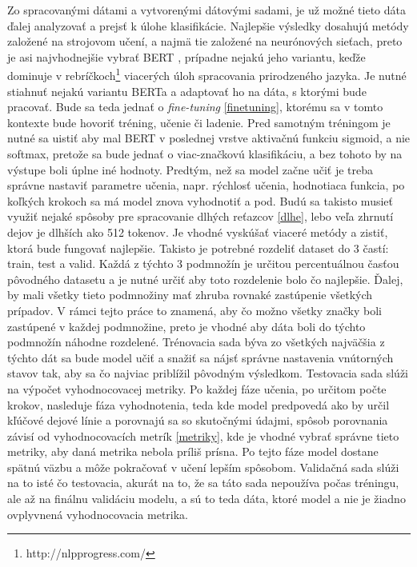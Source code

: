 Zo spracovanými dátami a vytvorenými dátovými sadami, je už možné tieto dáta ďalej analyzovať a prejsť k úlohe klasifikácie. Najlepšie výsledky dosahujú metódy založené na strojovom učení, a najmä tie založené na neurónových sieťach, preto je asi najvhodnejšie vybrať BERT \cite{Devlin:2018}, prípadne nejakú jeho variantu, keďže dominuje v rebríčkoch\footnote{http://nlpprogress.com/} viacerých úloh spracovania prirodzeného jazyka. Je nutné stiahnuť nejakú variantu BERTa a adaptovať ho na dáta, s ktorými bude pracovať. Bude sa teda jednať o \textit{fine-tuning} \ref{finetuning}, ktorému sa v tomto kontexte bude hovoriť tréning, učenie či ladenie. Pred samotným tréningom je nutné sa uistiť aby mal BERT v poslednej vrstve aktivačnú funkciu sigmoid, a nie softmax, pretože sa bude jednať o viac-značkovú klasifikáciu, a bez tohoto by na výstupe boli úplne iné hodnoty. Predtým, než sa model začne učiť je treba správne nastaviť parametre učenia, napr. rýchlosť učenia, hodnotiaca funkcia, po koľkých krokoch sa má model znova vyhodnotiť a pod. Budú sa takisto musieť využiť nejaké spôsoby pre spracovanie dlhých reťazcov \ref{dlhe}, lebo veľa zhrnutí dejov je dlhších ako 512 tokenov. Je vhodné vyskúšať viaceré metódy a zistiť, ktorá bude fungovať najlepšie. Takisto je potrebné rozdeliť dataset do 3 častí: train, test a valid. Každá z týchto 3 podmnožín je určitou percentuálnou časťou pôvodného datasetu a je nutné určiť aby toto rozdelenie bolo čo najlepšie. Ďalej, by mali všetky tieto podmnožiny mať zhruba rovnaké zastúpenie všetkých prípadov. V rámci tejto práce to znamená, aby čo možno všetky značky boli zastúpené v každej podmnožine, preto je vhodné aby dáta boli do týchto podmnožín náhodne rozdelené. Trénovacia sada býva zo všetkých najväčšia z týchto dát sa bude model učiť a snažiť sa nájsť správne nastavenia vnútorných stavov tak, aby sa čo najviac priblížil pôvodným výsledkom. Testovacia sada slúži na výpočet vyhodnocovacej metriky. Po každej fáze učenia, po určitom počte krokov, nasleduje fáza vyhodnotenia, teda kde model predpovedá ako by určil kľúčové dejové línie a porovnajú sa so skutočnými údajmi, spôsob porovnania závisí od vyhodnocovacích metrík \ref{metriky}, kde je vhodné vybrať správne tieto metriky, aby daná metrika nebola príliš prísna. Po tejto fáze model dostane spätnú väzbu a môže pokračovať v učení lepším spôsobom. Validačná sada slúži na to isté čo testovacia, akurát na to, že sa táto sada nepoužíva počas tréningu, ale až na finálnu validáciu modelu, a sú to teda dáta, ktoré model  a nie je žiadno ovplyvnená vyhodnocovacia metrika. 

